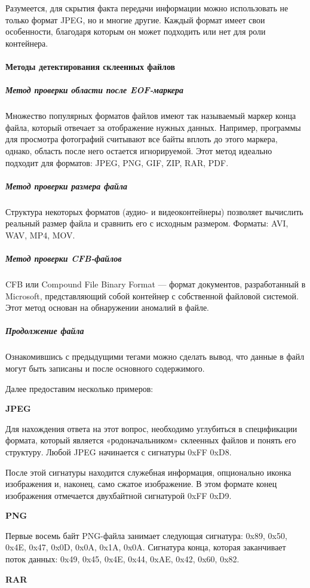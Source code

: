Разумеется, для скрытия факта передачи информации можно использовать не
только формат JPEG, но и многие другие. Каждый формат имеет свои особенности,
благодаря которым он может подходить или нет для роли контейнера.

\paragraph{Методы детектирования склеенных файлов}
\subparagraph{Метод проверки области после EOF-маркера} Множество популярных
форматов файлов имеют так называемый маркер конца файла, который отвечает за
отображение нужных данных. Например, программы для просмотра фотографий
считывают все байты вплоть до этого маркера, однако, область после него
остается игнорируемой. Этот метод идеально подходит для форматов: JPEG, PNG,
GIF, ZIP, RAR, PDF.

\subparagraph{Метод проверки размера файла} Структура некоторых форматов
(аудио- и видеоконтейнеры) позволяет вычислить реальный размер файла и
сравнить его с исходным размером. Форматы: AVI, WAV, MP4, MOV.

\subparagraph{Метод проверки CFB-файлов} CFB или Compound File Binary Format
— формат документов, разработанный в Microsoft, представляющий собой
контейнер с собственной файловой системой. Этот метод основан на обнаружении
аномалий в файле.

\subparagraph{Продолжение файла}

Ознакомившись с предыдущими тегами можно сделать вывод, что данные в файл
могут быть записаны и после основного содержимого.

Далее предоставим несколько примеров:

\textbf{JPEG}

Для нахождения ответа на этот вопрос, необходимо углубиться в спецификации
формата, который является «родоначальником» склеенных файлов и понять его
структуру. Любой JPEG начинается с сигнатуры 0xFF 0xD8.

После этой сигнатуры находится служебная информация, опционально иконка
изображения и, наконец, само сжатое изображение. В этом формате конец
изображения отмечается двухбайтной сигнатурой 0xFF 0xD9.

\textbf{PNG}

Первые восемь байт PNG-файла занимает следующая сигнатура: 0x89, 0x50, 0x4E,
0x47, 0x0D, 0x0A, 0x1A, 0x0A. Сигнатура конца, которая заканчивает поток
данных: 0x49, 0x45, 0x4E, 0x44, 0xAE, 0x42, 0x60, 0x82.

\textbf{RAR}

